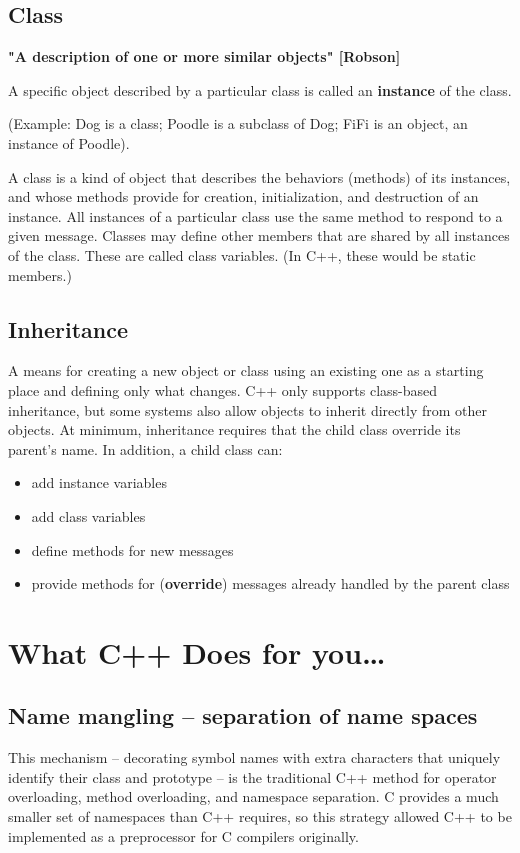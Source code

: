 \subsection{Class}
\textbf{"A description of one or more similar objects" [Robson]}

A specific object described by a particular class is called an
\textbf{instance} of the class.

(Example: Dog is a class; Poodle is a subclass of Dog; FiFi is an
object, an instance of Poodle).

A class is a kind of object that describes the behaviors (methods) of
its instances, and whose methods provide for creation, initialization,
and destruction of an instance. All instances of a particular class use
the same method to respond to a given message. Classes may define other
members that are shared by all instances of the class. These are called
class variables. (In C++, these would be static members.) 


\subsection{Inheritance}
A means for creating a new object or class using an existing one as a
starting place and defining only what changes. C++ only supports
class-based inheritance, but some systems also allow objects to inherit
directly from other objects. At minimum, inheritance requires that the
child class override its parent’s name. In addition, a child class can:
\begin{itemize}[noitemsep]
	\item add instance variables
	\item add class variables
	\item define methods for new messages
	\item provide methods for (\textbf{override}) messages already
	handled by the parent class
\end{itemize}


\section{What C++ Does for you…}
\subsection{Name mangling – separation of name spaces}
This mechanism – decorating symbol names with extra characters that
uniquely identify their class and prototype – is the traditional C++
method for operator overloading, method overloading, and namespace
separation. C provides a much smaller set of namespaces than C++
requires, so this strategy allowed C++ to be implemented as a
preprocessor for C compilers originally.


